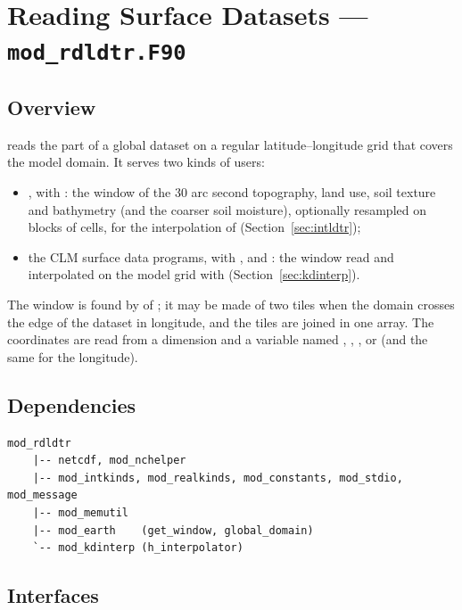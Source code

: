 \section{Reading Surface Datasets --- \texttt{mod\_rdldtr.F90}}
\label{sec:rdldtr}

\subsection{Overview}

 reads the part of a global dataset on a regular
latitude--longitude grid that covers the model domain. It serves two kinds
of users:
\begin{itemize}
  \item {}, with : the window of the 30 arc
        second topography, land use, soil texture and bathymetry (and the
        coarser soil moisture), optionally resampled on blocks of cells,
        for the interpolation of 
        (Section~\ref{sec:intldtr});
  \item the CLM surface data programs, with , 
        and : the window read and interpolated on the model
        grid with  (Section~\ref{sec:kdinterp}).
\end{itemize}
The window is found by  of ; it may be
made of two tiles when the domain crosses the edge of the dataset in
longitude, and the tiles are joined in one array. The coordinates are
read from a dimension and a variable named , ,
,  or  (and the same for the
longitude).

\subsection{Dependencies}

\begin{lstlisting}
mod_rdldtr
    |-- netcdf, mod_nchelper
    |-- mod_intkinds, mod_realkinds, mod_constants, mod_stdio, mod_message
    |-- mod_memutil
    |-- mod_earth    (get_window, global_domain)
    `-- mod_kdinterp (h_interpolator)
\end{lstlisting}

\subsection{Interfaces}

